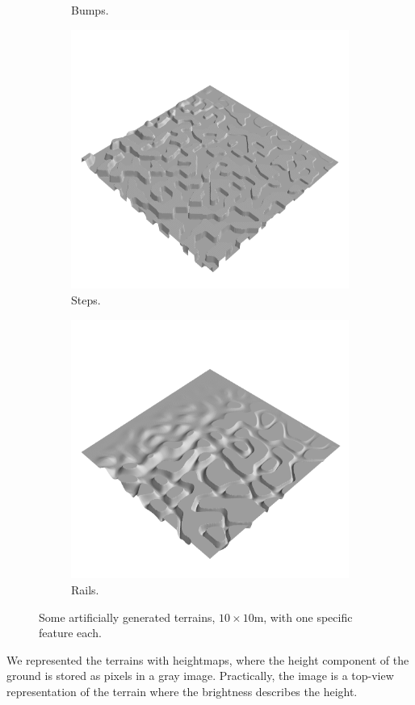 \documentclass[../document.tex]{subfiles}
\begin{document}
\begin{figure}[htbp]
\begin{subfigure}[b]{0.24\textwidth}
        \caption{Bumps.}
 \end{subfigure}  
    \begin{subfigure}[b]{0.24\textwidth}
        \includegraphics[width=\linewidth]{../img/hm3d/steps1.png}
        \caption{Steps.}
 \end{subfigure}  
    \begin{subfigure}[b]{0.24\textwidth}
        \includegraphics[width=\linewidth]{../img/hm3d/rails3.png}
        \caption{Rails.}
    \end{subfigure}  
\caption{Some artificially generated terrains, $10\times 10$m, with one specific feature each. }   
\label{fig : grounds}
\end{figure}
We represented the terrains with heightmaps, where the height component of the ground is stored as pixels in a gray image. Practically, the image is a top-view representation of the terrain where the brightness describes the height. 
\end{document}
